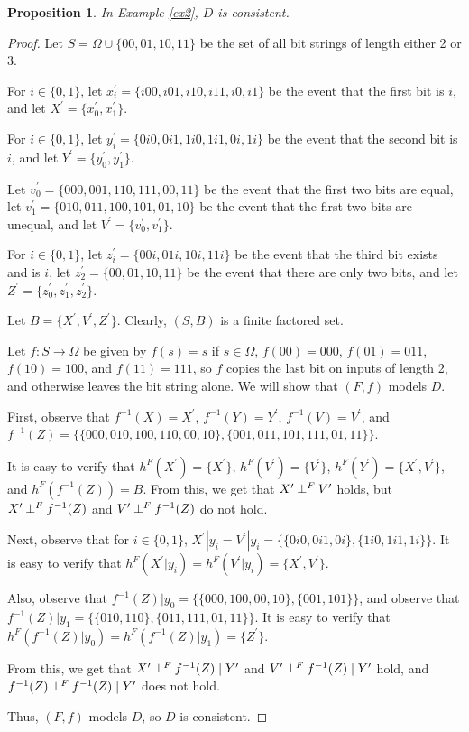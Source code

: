 \documentclass[authordate,onecolumn]{miri-tech-article}
\newtheorem{proposition}{Proposition}
\begin{document}
\begin{proposition}
In Example \ref{ex2}, $D$ is consistent.
\end{proposition}
\begin{proof}
Let $S=\Omega\cup\{00,01,10,11\}$ be the set of all bit strings of length either 2 or 3. 

For $i\in\{0,1\}$, let $x^\prime_i=\{i00,i01,i10,i11,i0,i1\}$ be the event that the first bit is $i$, and let $X^\prime=\{x_0^\prime,x_1^\prime\}$.

For $i\in\{0,1\}$, let $y^\prime_i=\{0i0,0i1,1i0,1i1,0i,1i\}$ be the event that the second bit is $i$, and let $Y^\prime=\{y_0^\prime,y_1^\prime\}$.

Let $v^\prime_0=\{000,001,110,111,00,11\}$ be the event that the first two bits are equal, let $v^\prime_1=\{010,011,100,101,01,10\}$ be the event that the first two bits are unequal, and let $V^\prime=\{v_0^\prime,v_1^\prime\}$.

For $i\in\{0,1\}$, let $z^\prime_i=\{00i,01i,10i,11i\}$ be the event that the third bit exists and is $i$, let $z^\prime_2=\{00,01,10,11\}$ be the event that there are only two bits, and let $Z^\prime=\{z_0^\prime,z_1^\prime,z^\prime_2\}$.

Let $B=\{X^\prime,V^\prime,Z^\prime\}$. Clearly, $(S,B)$ is a finite factored set.

Let $f:S\rightarrow \Omega$ be given by $f(s)=s$ if $s\in \Omega$, $f(00)=000$, $f(01)=011$, $f(10)=100$, and $f(11)=111$, so $f$ copies the last bit on inputs of length 2, and otherwise leaves the bit string alone. We will show that $(F,f)$ models $D$.

First, observe that $f^{-1}(X)=X^\prime$, $f^{-1}(Y)=Y^\prime$, $f^{-1}(V)=V^\prime$, and $f^{-1}(Z)=\{\{000,010,100,110,00,10\},\{001,011,101,111,01,11\}\}$. 

It is easy to verify that $h^F(X^\prime)=\{X^\prime\}$, $h^F(V^\prime)=\{V^\prime\}$, $h^F(Y^\prime)=\{X^\prime,V^\prime\}$, and $h^F(f^{-1}(Z))=B$. From this, we get that $X^\prime\mathbin{\perp^{F}}V^\prime$ holds, but  $X^\prime\mathbin{\perp^{F}}f^{-1}(Z)$ and $V^\prime\mathbin{\perp^{F}}f^{-1}(Z)$ do not hold.

Next, observe that for $i\in\{0,1\}$, $X^\prime|y_i=V^\prime|y_i=\{\{0i0,0i1,0i\},\{1i0,1i1,1i\}\}$. It is easy to verify that $h^F(X^\prime|y_i)=h^F(V^\prime|y_i)=\{X^\prime,V^\prime\}$. 

Also, observe that $f^{-1}(Z)|y_0=\{\{000,100,00,10\},\{001,101\}\}$, and observe that $f^{-1}(Z)|y_1=\{\{010,110\},\{011,111,01,11\}\}$. It is easy to verify that $h^F(f^{-1}(Z)|y_0)=h^F(f^{-1}(Z)|y_1)=\{Z^\prime\}$.

From this, we get that $X^\prime\mathbin{\perp^{F}}f^{-1}(Z)\mid Y^\prime$ and $V^\prime\mathbin{\perp^{F}}f^{-1}(Z)\mid Y^\prime$ hold, and $f^{-1}(Z)\mathbin{\perp^{F}}f^{-1}(Z)\mid Y^\prime$ does not hold. 

Thus, $(F,f)$ models $D$, so $D$ is consistent.
\end{proof}
\end{document}
